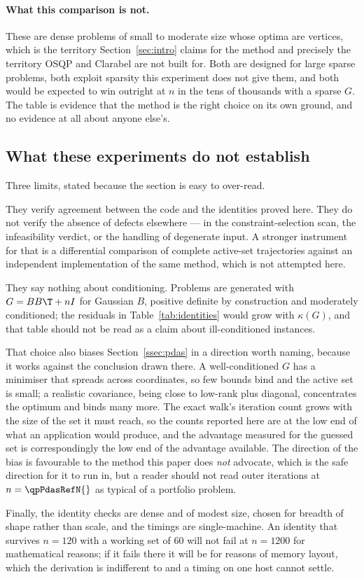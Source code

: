 \paragraph{What this comparison is not.} These are dense problems of small to
moderate size whose optima are vertices, which is the territory
Section~\ref{sec:intro} claims for the method and precisely the territory OSQP and
Clarabel are not built for. Both are designed for large sparse problems, both
exploit sparsity this experiment does not give them, and both would be expected to
win outright at $n$ in the tens of thousands with a sparse $G$. The table is
evidence that the method is the right choice on its own ground, and no evidence at
all about anyone else's.

\subsection{What these experiments do not establish}

Three limits, stated because the section is easy to over-read.

They verify agreement between the code and the identities proved here. They do not
verify the absence of defects elsewhere --- in the constraint-selection scan, the
infeasibility verdict, or the handling of degenerate input. A stronger instrument
for that is a differential comparison of complete active-set trajectories against
an independent implementation of the same method, which is not attempted here.

They say nothing about conditioning. Problems are generated with $G = BB\T + nI$
for Gaussian $B$, positive definite by construction and moderately conditioned;
the residuals in Table~\ref{tab:identities} would grow with $\kappa(G)$, and that
table should not be read as a claim about ill-conditioned instances.

That choice also biases Section~\ref{ssec:pdas} in a direction worth naming,
because it works against the conclusion drawn there. A well-conditioned $G$ has a
minimiser that spreads across coordinates, so few bounds bind and the active set
is small; a realistic covariance, being close to low-rank plus diagonal,
concentrates the optimum and binds many more. The exact walk's iteration count
grows with the size of the set it must reach, so the counts reported here are at
the low end of what an application would produce, and the advantage measured for
the guessed set is correspondingly the low end of the advantage available. The
direction of the bias is favourable to the method this paper does \emph{not}
advocate, which is the safe direction for it to run in, but a reader should not
read \qpPdasBudgetOuter{} outer iterations at $n = \qpPdasRefN{}$ as typical of a
portfolio problem.

Finally, the identity checks are dense and of modest size, chosen for breadth of
shape rather than scale, and the timings are single-machine. An identity that
survives $n = 120$ with a working set of $60$ will not fail at $n = 1200$ for
mathematical reasons; if it fails there it will be for reasons of memory layout,
which the derivation is indifferent to and a timing on one host cannot settle.
